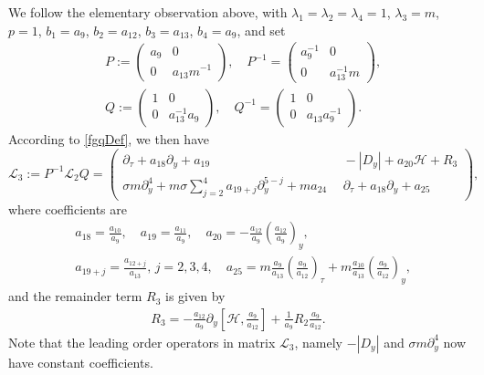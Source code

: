 \documentclass[12pt]{amsart}
\theoremstyle{remark}
\theoremstyle{definition}
\numberwithin{equation}{section}
\newcommand{\p}{\partial}
\newcommand{\f}{\frac}
\newcommand{\la}{\lambda}
\newcommand{\mH}{\mathcal{H}}
\newcommand{\mL}{\mathcal{L}}
\begin{document}
We follow the elementary observation above, with $\la_1=\la_2=\la_4=1$, $\la_3=m$, $p=1$, $b_1=a_9$, $b_2=a_{12}$, $b_3=a_{13}$, $b_4=a_9$, and set
\begin{equation} \label{PQDef}
 \begin{aligned}
&P:=\begin{pmatrix} 
a_9 & 0 \\ 
0 & a_{13}m^{-1}
\end{pmatrix},
\quad
P^{-1}=\begin{pmatrix} 
a^{-1}_9 & 0 \\ 
0 & a^{-1}_{13}m
\end{pmatrix},\\
&Q:=\begin{pmatrix} 
1 & 0 \\ 
0 & a^{-1}_{13}a_9
\end{pmatrix},
\quad
Q^{-1}=\begin{pmatrix} 
1 & 0 \\ 
0 & a_{13}a_9^{-1}
\end{pmatrix}.
\end{aligned}   
\end{equation}
According to \eqref{fgqDef}, we then have
\begin{equation}  \label{LThreeMatrix}
\mL_3:=P^{-1}\mL_2 Q
=\begin{pmatrix}
 \p_\tau+ a_{18} \p_y + a_{19}  \  & \ - |D_y|+a_{20}\mH+R_3 \\ 
\sigma m \p^4_y+m\sigma\sum_{j= 2}^4 a_{19+j}\p_y^{5-j} + m a_{24} \ & \  \p_{\tau} + a_{18} \p_y+a_{25}
\end{pmatrix},
\end{equation}
where coefficients are 
\begin{align*}
&a_{18}=\f{a_{10}}{a_9},\quad a_{19}=\f{a_{11}}{a_9},\quad a_{20}=-\f{a_{12}}{a_{9}}\left(\f{a_{12}}{a_9}\right)_y,\\
&a_{19+j}=\f{a_{12+j}}{a_{13}},\, j=2,3,4,\quad a_{25}=m\f{a_9}{a_{13}}\left(\f{a_9}{a_{12}}\right)_{\tau}+m\f{a_{10}}{a_{13}}\left(\f{a_9}{a_{12}}\right)_y,
\end{align*}
and the remainder term $R_{3}$ is given by
\begin{align*}
R_{3}=-\f{a_{12}}{a_9}\p_y\left[\mH, \f{a_9}{a_{12}}\right]+\f{1}{a_{9}}R_2\f{a_9}{a_{12}}.
\end{align*}
Note that the leading order operators in matrix $\mL_3$, namely $-|D_y|$ and $\sigma m \p_y^4$ now have constant coefficients.
\end{document}
